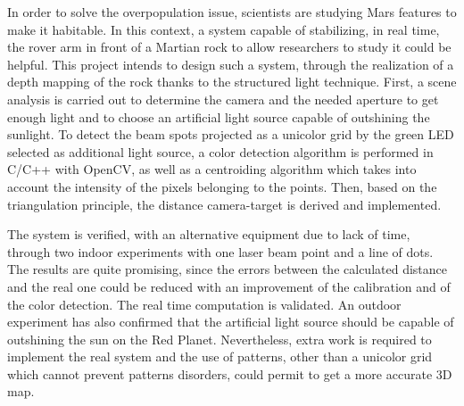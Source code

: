 In order to solve the overpopulation issue, scientists are studying Mars features to make it habitable. In this context, a system capable of stabilizing, in real time, the rover arm in front of a Martian rock to allow researchers to study it could be helpful. This project intends to design such a system, through the realization of a depth mapping of the rock thanks to the structured light technique. First, a scene analysis is carried out to determine the camera and the needed aperture to get enough light and to choose an artificial light source capable of outshining the sunlight. To detect the beam spots projected as a unicolor grid by the green LED selected as additional light source, a color detection algorithm is performed in C/C++ with OpenCV, as well as a centroiding algorithm which takes into account the intensity of the pixels belonging to the points. Then, based on the triangulation principle, the distance camera-target is derived and implemented.

The system is verified, with an alternative equipment due to lack of time, through two indoor experiments with one laser beam point and a line of dots. The results are quite promising, since the errors between the calculated distance and the real one could be reduced with an improvement of the calibration and of the color detection. The real time computation is validated. An outdoor experiment has also confirmed that the artificial light source should be capable of outshining the sun on the Red Planet. Nevertheless, extra work is required to implement the real system and the use of patterns, other than a unicolor grid which cannot prevent patterns disorders, could permit to get a more accurate 3D map.